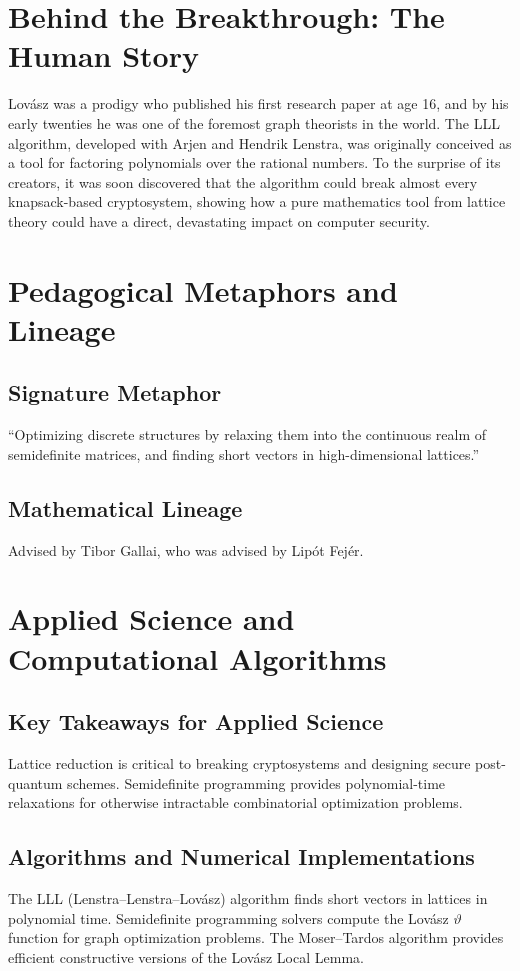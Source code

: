 \section{Behind the Breakthrough: The Human Story}

Lov\'asz was a prodigy who published his first research paper at age 16, and by his early twenties he was one of the foremost graph theorists in the world. The LLL algorithm, developed with Arjen and Hendrik Lenstra, was originally conceived as a tool for factoring polynomials over the rational numbers. To the surprise of its creators, it was soon discovered that the algorithm could break almost every knapsack-based cryptosystem, showing how a pure mathematics tool from lattice theory could have a direct, devastating impact on computer security.

\section{Pedagogical Metaphors and Lineage}
\subsection{Signature Metaphor}
``Optimizing discrete structures by relaxing them into the continuous realm of semidefinite matrices, and finding short vectors in high-dimensional lattices.''

\subsection{Mathematical Lineage}
Advised by Tibor Gallai, who was advised by Lip\'ot Fej\'er.

\section{Applied Science and Computational Algorithms}
\subsection{Key Takeaways for Applied Science}
Lattice reduction is critical to breaking cryptosystems and designing secure post-quantum schemes. Semidefinite programming provides polynomial-time relaxations for otherwise intractable combinatorial optimization problems.

\subsection{Algorithms and Numerical Implementations}
The LLL (Lenstra--Lenstra--Lov\'asz) algorithm finds short vectors in lattices in polynomial time. Semidefinite programming solvers compute the Lov\'asz $\vartheta$ function for graph optimization problems. The Moser--Tardos algorithm provides efficient constructive versions of the Lov\'asz Local Lemma.

